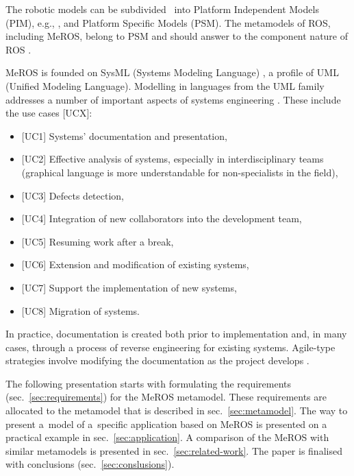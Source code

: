 \documentclass{ieeeaccess}
\begin{document}
	The robotic models can be subdivided~\cite{de2021survey} into Platform Independent Models (PIM), e.g., \cite{zielinski2017variable,zielinski2010motion,tasker2020,earl2020}, and Platform Specific Models (PSM). The metamodels of ROS, including MeROS, belong to PSM and should answer to the component nature of ROS \cite{Figat:2022:RAS,wenger2016model}.
		
 MeROS is founded on SysML (Systems Modeling Language) \cite{omg-sysml16,Friedenthal:2015}, a profile of UML (Unified Modeling Language). Modelling in languages from the UML family addresses a number of important aspects of systems engineering \cite{chaudron2012effective}. These include the use cases [UCX]:
	\begin{itemize}
		\item $[$UC1] Systems' documentation and presentation,
		\item $[$UC2] Effective analysis of systems, especially in interdisciplinary teams (graphical language is more understandable for non-specialists in the field), 
		\item $[$UC3] Defects detection,
		\item $[$UC4] Integration of new collaborators into the development team,
		\item $[$UC5] Resuming work after a break,
		\item $[$UC6] Extension and modification of existing systems,
		\item $[$UC7] Support the implementation of new systems,
		\item $[$UC8] Migration of systems.   
	\end{itemize}
	
	In practice, documentation is created both prior to implementation and, in many cases, through a process of reverse  engineering \cite{canfora2007new} for existing systems. Agile-type strategies involve modifying the documentation as the project develops \cite{habib2021systematic}.
			
	The following presentation starts with formulating the requirements (sec.~\ref{sec:requirements}) for the MeROS metamodel. These requirements are allocated to the metamodel that is described in sec.~\ref{sec:metamodel}. The way to present a~model of a~specific application based on MeROS is presented on a practical example in sec.~\ref{sec:application}.
	A comparison of the MeROS with similar metamodels is presented in sec.~\ref{sec:related-work}. The paper is finalised with conclusions (sec.~\ref{sec:conslusions}).
	
\end{document}
